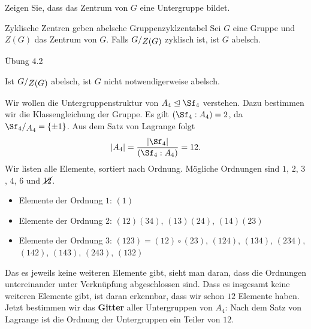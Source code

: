 \begin{übung}
Zeigen Sie, dass das Zentrum von $G$ eine Untergruppe bildet.
\end{übung}
\begin{satz}{Zyklische Zentren geben abelsche Gruppen}{zyklzentabel}
Sei $G$ eine Gruppe und $Z(G)$ das Zentrum von $G$. Falls $\quotient{G}{Z(G)}$ zyklisch ist, ist $G$ abelsch.
\end{satz}
\begin{beweis}
Übung 4.2
\end{beweis}
\begin{bemerkung}
Ist $\quotient{G}{Z(G)}$ abelsch, ist $G$ nicht notwendigerweise abelsch.
\end{bemerkung}
\begin{beispiel}
Wir wollen die Untergruppenstruktur von $A_4 \lnormal \Sf_4$ verstehen. Dazu bestimmen wir die Klassengleichung der Gruppe. Es gilt $(\Sf_4 : A_4)  =2$, da $\quotient{\Sf_4}{A_4} = \{\pm 1\}$. Aus dem Satz von Lagrange folgt 
\begin{equation}
|A_4| = \frac{|\Sf_4|}{(\Sf_4 : A_4)} = 12.
\end{equation}
Wir listen alle Elemente, sortiert nach Ordnung. Mögliche Ordnungen sind $1$, $2$, $3$, $4$, $6$ und $\cancel{12}$.
\begin{itemize}
\item Elemente der Ordnung $1$: $(1)$
\item Elemente der Ordnung $2$: $(12)(34)$, $(13)(24)$, $(14)(23)$
\item Elemente der Ordnung $3$: $(123)=(12)\circ (23)$, $(124)$, $(134)$, $(234)$, $(142)$, $(143)$, $(243)$, $(132)$
\end{itemize}
Das es jeweils keine weiteren Elemente gibt, sieht man daran, dass die Ordnungen untereinander unter Verknüpfung abgeschlossen sind. Dass es insgesamt keine weiteren Elemente gibt, ist daran erkennbar, dass wir schon $12$ Elemente haben.\\
Jetzt bestimmen wir das \textbf{Gitter} aller Untergruppen von $A_4$: Nach dem Satz von Lagrange ist die Ordnung der Untergruppen ein Teiler von $12$.
\begin{center}
\end{center}
\end{beispiel}

